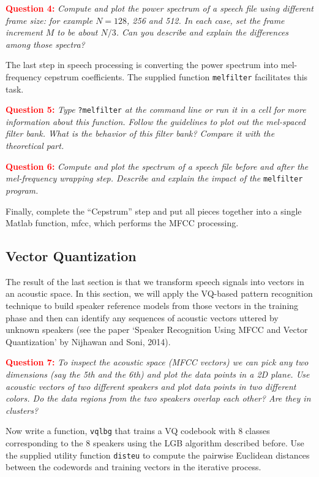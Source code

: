 \documentclass{article}
\begin{document}
\textcolor{red}{\textbf{Question 4:}} \textit{Compute and plot the power spectrum of a speech file using different frame size: for example $N = 128$, 256 and 512.  In each case, set the frame increment $M$ to be about $N/3$.  Can you describe and explain the differences among those spectra?}

The last step in speech processing is converting the power spectrum into mel-frequency cepstrum coefficients. The supplied function \texttt{melfilter} facilitates this task.

\textcolor{red}{\textbf{Question 5:}} \textit{Type} \texttt{?melfilter} \textit{at the command line or run it in a cell for more information about this function.  Follow the guidelines to plot out the mel-spaced filter bank. What is the behavior of this filter bank?  Compare it with the theoretical part.}

\textcolor{red}{\textbf{Question 6:}} \textit{Compute and plot the spectrum of a speech file before and after the mel-frequency wrapping step.  Describe and explain the impact of the} \texttt{melfilter} \textit{program.}

Finally, complete the “Cepstrum” step and put all pieces together into a single Matlab function, mfcc, which performs the MFCC processing.

\subsection{Vector Quantization}
The result of the last section is that we transform speech signals into vectors in an acoustic space.  In this section, we will apply the VQ-based pattern recognition technique to build speaker reference models from those vectors in the training phase and then can identify any sequences of acoustic vectors uttered by unknown speakers (see the paper ‘Speaker Recognition Using MFCC and Vector Quantization’ by Nijhawan and Soni, 2014).

\textcolor{red}{\textbf{Question 7:}} \textit{To inspect the acoustic space (MFCC vectors) we can pick any two dimensions (say the 5th and the 6th) and plot the data points in a 2D plane.  Use acoustic vectors of two different speakers and plot data points in two different colors.  Do the data regions from the two speakers overlap each other?  Are they in clusters?}

Now write a function, \texttt{vqlbg} that trains a VQ codebook  with 8 classes corresponding to the 8 speakers using the LGB algorithm described before.  Use the supplied utility function \texttt{disteu} to compute the pairwise Euclidean distances between the codewords and training vectors in the iterative process.
\end{document}
